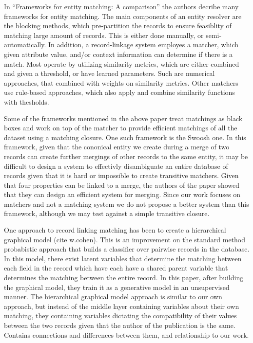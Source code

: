 \documentclass[]{article}
\begin{document}
In ``Frameworks for entity matching: A comparison'' the authors decribe many frameworks for entity matching. The main components of an entity resolver are the blocking methods, which pre-partition the records to ensure feasiblity of matching large amount of records. This is either done manually, or semi-automatically. In addition, a record-linkage system employes a matcher, which given attribute value, and/or context information can determine if there is a match. Most operate by utilizing similarity metrics, which are either combined and given a threshold, or have learned parameters. Such are numerical approaches, that combined with weights on similarity metrics. Other matchers use rule-based approaches, which also apply and combine similarity functions with thesholds.

Some of the frameworks mentioned in the above paper treat matchings as black boxes and work on top of the matcher to provide efficient matchings of all the dataset using a matching closure. One such framework is the Swoosh one. In this framework, given that the cononical entity we create during a merge of two records can create further mergings of other records to the same entity, it may be difficult to design a system to effectivly disambiguate an entire database of records given that it is hard or impossible to create transitive matchers. Given that four properties can be linked to a merge, the authors of the paper showed that they can design an efficient system for merging. Since our work focuses on matchers and not a matching system we do not propose a better system than this framework, although we may test against a simple transitive closure.

One approach to record linking matching has been to create a hierarchical graphical model (cite w.cohen). This is an improvement on the standard method probabistic approach that builds a classifier over pairwise records in the database. In this model, there exist latent variables that determine the matching between each field in the record which have each have a shared parent variable that determines the matching between the entire record. In this paper, after building the graphical model, they train it as a generative model in an unsupervised manner. The hierarchical graphical model approach is similar to our own approach, but instead of the middle layer containing variables about their own matching, they containing variables dictating the compatibility of their values between the two records given that the author of the publication is the same.
Contains connections and differences between them, and relationship to our work.
\end{document}
